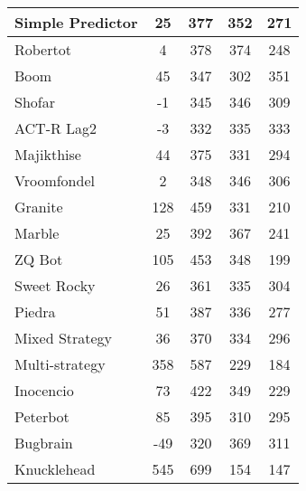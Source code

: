 \begin{table*}
\begin{tabular}{|l|c|c|c|c|}
Simple Predictor & 25 & 377 & 352 & 271 \\ \hline 
Robertot & 4 & 378 & 374 & 248 \\ \hline 
Boom & 45 & 347 & 302 & 351 \\ \hline 
Shofar & -1 & 345 & 346 & 309 \\ \hline 
ACT-R Lag2 & -3 & 332 & 335 & 333 \\ \hline 
Majikthise & 44 & 375 & 331 & 294 \\ \hline 
Vroomfondel & 2 & 348 & 346 & 306 \\ \hline 
Granite & 128 & 459 & 331 & 210 \\ \hline 
Marble & 25 & 392 & 367 & 241 \\ \hline 
ZQ Bot & 105 & 453 & 348 & 199 \\ \hline 
Sweet Rocky & 26 & 361 & 335 & 304 \\ \hline 
Piedra & 51 & 387 & 336 & 277 \\ \hline 
Mixed Strategy & 36 & 370 & 334 & 296 \\ \hline 
Multi-strategy & 358 & 587 & 229 & 184 \\ \hline 
Inocencio & 73 & 422 & 349 & 229 \\ \hline 
Peterbot & 85 & 395 & 310 & 295 \\ \hline 
Bugbrain & -49 & 320 & 369 & 311 \\ \hline 
Knucklehead & 545 & 699 & 154 & 147 \\ \hline
        \end{tabular}
    \end{table*}